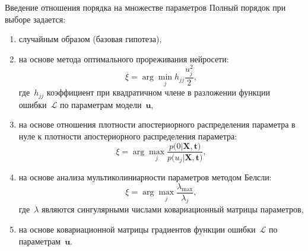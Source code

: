 \documentclass[10pt,pdf,hyperref={unicode}]{beamer}
\begin{document}
\begin{frame}{Введение отношения порядка на множестве параметров}
Полный порядок при выборе задается:
\begin{enumerate}[1)]
	\item случайным образом (базовая гипотеза),
	\item на основе метода оптимального прореживания нейросети:
	\[
	\xi = \arg \min_{j} h_{jj}\frac{u_j^2}{2},
	\]
	где~$h_{jj}$ коэффициент при квадратичном члене в разложении функции ошибки~$\mathcal{L}$ по параметрам модели~$\textbf{u}$,
	\item на основе отношения плотности апостериорного распределения параметра в нуле к плотности апостериорного распределения параметра:
	\[
	\xi = \arg \max_{j} \frac{p\bigr(0|\textbf{X}, \textbf{t}\bigr)}{p\bigr(u_j|\textbf{X}, \textbf{t}\bigr)},
	\]
	\item на основе анализа мультиколиниарности параметров методом Белсли:
	\[
	\xi = \arg \max_{j} \frac{\lambda_{\max}}{\lambda_{j}}, 
	\]
	где~$\lambda$ являются сингулярными числами ковариационный матрицы параметров,
	\item на основе ковариационной матрицы градиентов функции ошибки~$\mathcal{L}$ по параметрам~$\textbf{u}$.
	
\end{enumerate}
\end{frame}

\end{document}
